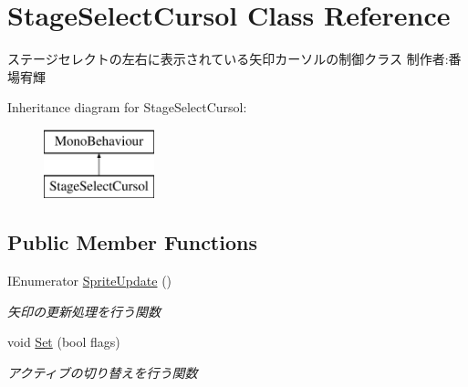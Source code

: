 \hypertarget{class_stage_select_cursol}{}\section{Stage\+Select\+Cursol Class Reference}
\label{class_stage_select_cursol}


ステージセレクトの左右に表示されている矢印カーソルの制御クラス 制作者\+:番場宥輝  


Inheritance diagram for Stage\+Select\+Cursol\+:\begin{figure}[H]
\begin{center}
\leavevmode
\includegraphics[height=2.000000cm]{class_stage_select_cursol}
\end{center}
\end{figure}
\subsection*{Public Member Functions}
\begin{DoxyCompactItemize}
\item 
I\+Enumerator \hyperlink{class_stage_select_cursol_a9879ca6a9ffa7ae70512430e12b1d305}{Sprite\+Update} ()
\begin{DoxyCompactList}\small\item\em 矢印の更新処理を行う関数 \end{DoxyCompactList}\item 
void \hyperlink{class_stage_select_cursol_abc3fdba5889193a4279766151081e6c5}{Set} (bool flags)
\begin{DoxyCompactList}\small\item\em アクティブの切り替えを行う関数 \end{DoxyCompactList}\end{DoxyCompactItemize}
